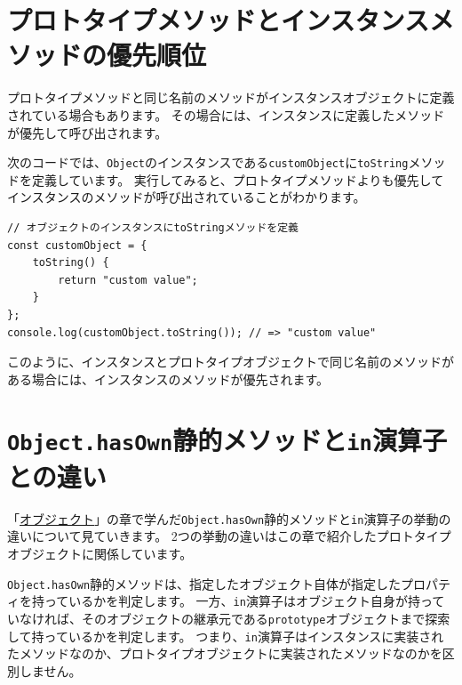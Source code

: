 \hypertarget{same-method-name-order}{%
\section{プロトタイプメソッドとインスタンスメソッドの優先順位}\label{same-method-name-order}}

プロトタイプメソッドと同じ名前のメソッドがインスタンスオブジェクトに定義されている場合もあります。
その場合には、インスタンスに定義したメソッドが優先して呼び出されます。

次のコードでは、\texttt{Object}のインスタンスである\texttt{customObject}に\texttt{toString}メソッドを定義しています。
実行してみると、プロトタイプメソッドよりも優先してインスタンスのメソッドが呼び出されていることがわかります。

\begin{lstlisting}
// オブジェクトのインスタンスにtoStringメソッドを定義
const customObject = {
    toString() {
        return "custom value";
    }
};
console.log(customObject.toString()); // => "custom value"
\end{lstlisting}

このように、インスタンスとプロトタイプオブジェクトで同じ名前のメソッドがある場合には、インスタンスのメソッドが優先されます。

\hypertarget{diff-in-operator-and-object-hasown}{%
\section{\texorpdfstring{\texttt{Object.hasOwn}静的メソッドと\texttt{in}演算子との違い}{Object.hasOwn静的メソッドとin演算子との違い}}\label{diff-in-operator-and-object-hasown}}

「\hyperlink{object}{オブジェクト}」の章で学んだ\texttt{Object.hasOwn}静的メソッドと\texttt{in}演算子の挙動の違いについて見ていきます。
2つの挙動の違いはこの章で紹介したプロトタイプオブジェクトに関係しています。

\texttt{Object.hasOwn}静的メソッドは、指定したオブジェクト自体が指定したプロパティを持っているかを判定します。
一方、\texttt{in}演算子はオブジェクト自身が持っていなければ、そのオブジェクトの継承元である\texttt{prototype}オブジェクトまで探索して持っているかを判定します。
つまり、\texttt{in}演算子はインスタンスに実装されたメソッドなのか、プロトタイプオブジェクトに実装されたメソッドなのかを区別しません。

